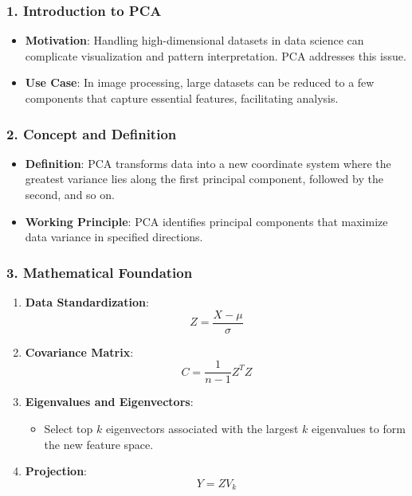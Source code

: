 \documentclass[aspectratio=169]{beamer}
\begin{document}
\begin{frame}[fragile]
    \frametitle{1. Introduction to PCA}
    \begin{itemize}
        \item \textbf{Motivation}: Handling high-dimensional datasets in data science can complicate visualization and pattern interpretation. PCA addresses this issue.
        \item \textbf{Use Case}: In image processing, large datasets can be reduced to a few components that capture essential features, facilitating analysis.
    \end{itemize}
\end{frame}

\begin{frame}[fragile]
    \frametitle{2. Concept and Definition}
    \begin{itemize}
        \item \textbf{Definition}: PCA transforms data into a new coordinate system where the greatest variance lies along the first principal component, followed by the second, and so on.
        \item \textbf{Working Principle}: PCA identifies principal components that maximize data variance in specified directions.
    \end{itemize}
\end{frame}

\begin{frame}[fragile]
    \frametitle{3. Mathematical Foundation}
    \begin{enumerate}
        \item \textbf{Data Standardization}:
        \begin{equation}
            Z = \frac{X - \mu}{\sigma}
        \end{equation}
        
        \item \textbf{Covariance Matrix}:
        \begin{equation}
            C = \frac{1}{n-1} Z^T Z
        \end{equation}
        
        \item \textbf{Eigenvalues and Eigenvectors}:
        \begin{itemize}
            \item Select top \( k \) eigenvectors associated with the largest \( k \) eigenvalues to form the new feature space.
        \end{itemize}
        
        \item \textbf{Projection}:
        \begin{equation}
            Y = Z V_k
        \end{equation}
    \end{enumerate}
\end{frame}
\end{document}
